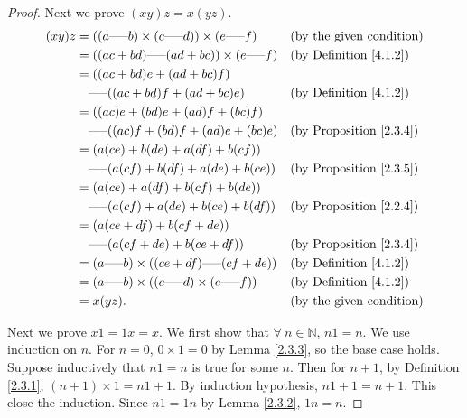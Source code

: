 \begin{proof}
Next we prove \((xy)z = x(yz)\).
\begin{align*}
(xy)z &= ((a \text{-----} b) \times (c \text{-----} d)) \times (e \text{-----} f) && \text{(by the given condition)} \\
&= ((ac + bd) \text{-----} (ad + bc)) \times (e \text{-----} f) && \text{(by Definition \ref{4.1.2})} \\
&= ((ac + bd)e + (ad + bc)f) \\
&\quad \text{-----} ((ac + bd)f + (ad + bc)e) && \text{(by Definition \ref{4.1.2})} \\
&= ((ac)e + (bd)e + (ad)f + (bc)f) \\
&\quad \text{-----} ((ac)f + (bd)f + (ad)e + (bc)e) && \text{(by Proposition \ref{2.3.4})} \\
&= (a(ce) + b(de) + a(df) + b(cf)) \\
&\quad \text{-----} (a(cf) + b(df) + a(de) + b(ce)) && \text{(by Proposition \ref{2.3.5})} \\
&= (a(ce) + a(df) + b(cf) + b(de)) \\
&\quad \text{-----} (a(cf) + a(de) + b(ce) + b(df)) && \text{(by Proposition \ref{2.2.4})} \\
&= (a(ce + df) + b(cf + de)) \\
&\quad \text{-----} (a(cf + de) + b(ce + df)) && \text{(by Proposition \ref{2.3.4})} \\
&= (a \text{-----} b) \times ((ce + df) \text{-----} (cf + de)) && \text{(by Definition \ref{4.1.2})} \\
&= (a \text{-----} b) \times ((c \text{-----} d) \times (e \text{-----} f)) && \text{(by Definition \ref{4.1.2})} \\
&= x(yz). && \text{(by the given condition)}
\end{align*}

Next we prove \(x1 = 1x = x\).
We first show that \(\forall\ n \in \mathds{N}\), \(n1 = n\).
We use induction on \(n\).
For \(n=0\), \(0 \times 1 = 0\) by Lemma \ref{2.3.3}, so the base case holds.
Suppose inductively that \(n1 = n\) is true for some \(n\).
Then for \(n + 1\), by Definition \ref{2.3.1}, \((n + 1) \times 1 = n1 + 1\).
By induction hypothesis, \(n1 + 1 = n + 1\).
This close the induction.
Since \(n1 = 1n\) by Lemma \ref{2.3.2}, \(1n = n\).


\end{proof}
